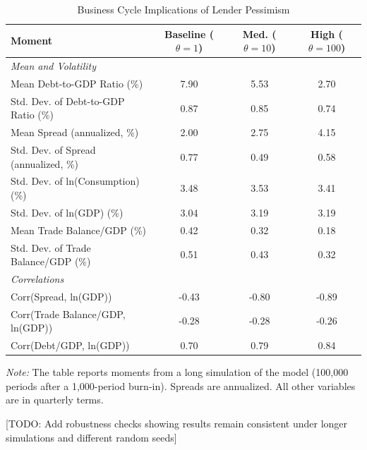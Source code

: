\documentclass[12pt]{article}
\theoremstyle{plain}
\begin{document}
\begin{table}[h]
	\centering
	\caption{Business Cycle Implications of Lender Pessimism}
	\label{tab:main_results}
	\begin{tabular}{@{}lccc@{}}
		\toprule
		Moment                               & Baseline ($\theta=1$) & Med. ($\theta=10$) & High  ($\theta=100$) \\ \midrule
		\multicolumn{3}{l}{\textit{Mean and Volatility}}                                                         \\
		Mean Debt-to-GDP Ratio (\%)          & 7.90                  & 5.53               & 2.70                 \\
		Std. Dev. of Debt-to-GDP Ratio (\%)  & 0.87                  & 0.85               & 0.74                 \\
		Mean Spread (annualized, \%)         & 2.00                  & 2.75               & 4.15                 \\
		Std. Dev. of Spread (annualized, \%) & 0.77                  & 0.49               & 0.58                 \\
		Std. Dev. of ln(Consumption) (\%)    & 3.48                  & 3.53               & 3.41                 \\
		Std. Dev. of ln(GDP) (\%)            & 3.04                  & 3.19               & 3.19                 \\
		Mean Trade Balance/GDP (\%)          & 0.42                  & 0.32               & 0.18                 \\
		Std. Dev. of Trade Balance/GDP (\%)  & 0.51                  & 0.43               & 0.32                 \\
		\multicolumn{3}{l}{\textit{Correlations}}                                                                \\
		Corr(Spread, ln(GDP))                & -0.43                 & -0.80              & -0.89                \\
		Corr(Trade Balance/GDP, ln(GDP))     & -0.28                 & -0.28              & -0.26                \\
		Corr(Debt/GDP, ln(GDP))              & 0.70                  & 0.79               & 0.84                 \\ \bottomrule
	\end{tabular}
	\parbox{\linewidth}{\small\textit{Note:} The table reports moments from a long simulation of the model (100,000 periods after a 1,000-period burn-in). Spreads are annualized. All other variables are in quarterly terms.}

	{\color{red}[TODO: Add robustness checks showing results remain consistent under longer simulations and different random seeds]}
\end{table}
\end{document}
